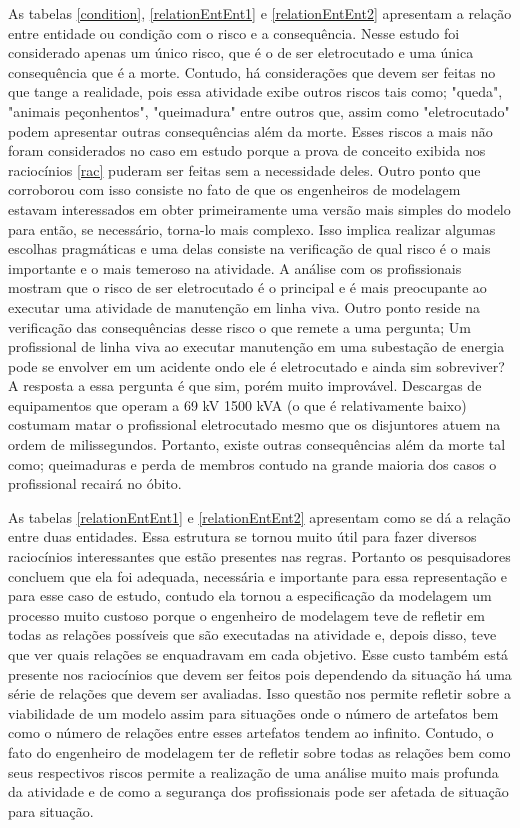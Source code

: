 As tabelas \ref{condition}, \ref{relationEntEnt1} e \ref{relationEntEnt2} apresentam a relação entre entidade ou condição com o risco e a consequência. Nesse estudo foi considerado apenas um 
único risco, que é o de ser eletrocutado e uma única consequência que é a morte. Contudo, há considerações que devem ser feitas no que tange a realidade, pois essa atividade exibe outros 
riscos tais como; "queda", "animais peçonhentos", "queimadura" entre outros que, assim como "eletrocutado" podem apresentar outras consequências além da morte. Esses riscos a mais não foram 
considerados no caso em estudo porque a prova de conceito exibida nos raciocínios \ref{rac} puderam ser feitas sem a necessidade deles. Outro ponto que corroborou com isso consiste no fato 
de que os engenheiros de modelagem estavam interessados em obter primeiramente uma versão mais simples do modelo para então, se necessário, torna-lo mais complexo. Isso implica realizar 
algumas escolhas pragmáticas e uma delas consiste na verificação de qual risco é o mais importante e o mais temeroso na atividade. A análise com os profissionais mostram que o risco de 
ser eletrocutado é o principal e é mais preocupante ao executar uma atividade de manutenção em linha viva. Outro ponto reside na verificação das consequências desse risco o que remete 
a uma pergunta; Um profissional de linha viva ao executar manutenção em uma subestação de energia pode se envolver em um acidente ondo ele é eletrocutado e ainda sim sobreviver? A resposta 
a essa pergunta é que sim, porém muito improvável. Descargas de equipamentos que operam a 69 kV 1500 kVA  (o que é relativamente baixo) costumam matar o profissional eletrocutado mesmo que 
os disjuntores atuem na ordem de milissegundos. Portanto, existe outras consequências além da morte tal como; queimaduras e perda de membros contudo na grande maioria dos casos o profissional 
recairá no óbito. 

As tabelas \ref{relationEntEnt1} e \ref{relationEntEnt2} apresentam como se dá a relação entre duas entidades. Essa estrutura se tornou muito útil para fazer diversos raciocínios interessantes
que estão presentes nas regras. Portanto os pesquisadores concluem que ela foi adequada, necessária e importante para essa representação e para esse caso de estudo, contudo ela tornou a 
especificação da modelagem um processo muito custoso porque o engenheiro de modelagem teve de refletir em todas as relações possíveis que são executadas na atividade e, depois disso, teve 
que ver quais relações se enquadravam em cada objetivo. Esse custo também está presente nos raciocínios que devem ser feitos pois dependendo da situação há uma série de relações que devem 
ser avaliadas. Isso questão nos permite refletir sobre a viabilidade de um modelo assim para situações onde o número de artefatos bem como o número de relações entre esses artefatos tendem ao 
infinito. Contudo, o fato do engenheiro de modelagem ter de refletir sobre todas as relações bem como seus respectivos riscos permite a realização de uma análise muito mais profunda 
da atividade e de como a segurança dos profissionais pode ser afetada de situação para situação. 

